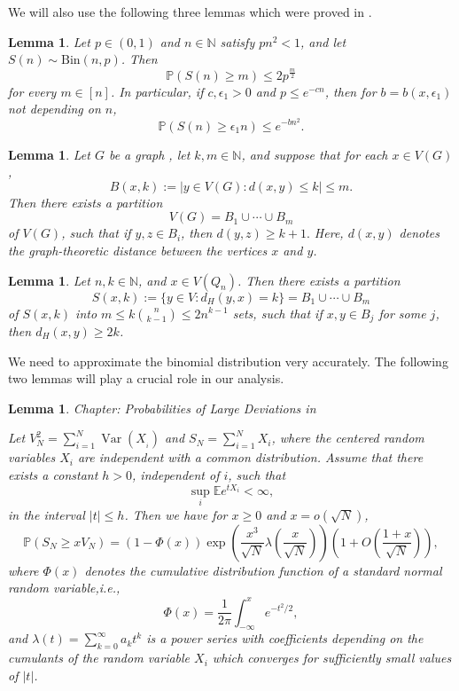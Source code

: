 \documentclass[reqno,11pt]{amsart}
\newtheorem{lemma}[theorem]{Lemma}
\renewcommand{\leq}{\leqslant}
\renewcommand{\geq}{\geqslant}
\DeclareMathOperator{\Var}{Var}
\begin{document}
We will also use the following three lemmas which were proved in \cite{balogh2007majority}. 
\begin{lemma} \label{lemma:S(n) m}
    Let $p \in (0,1)$ and $n \in \mathbb{N}$ satisfy $pn^2 <1$, and let $S(n) \sim \text{Bin}(n,p)$. Then 
    $$\mathbb{P}(S(n) \geq m) \leq 2p^{\frac{m}{2}}$$
for every $m \in [n]$. In particular, if $c,\epsilon_1 >0 $ and $p \leq e^{-cn}$, then for $b=b(x,\epsilon_1)$ not depending on $n$,
$$\mathbb{P}(S(n)\geq \epsilon_1 n) \leq e^{-bn^2}.$$
\end{lemma}

\begin{lemma} \label{lemma: graph partition}
Let $G$ be a graph , let $k,m \in \mathbb{N}$, and suppose that for each $x \in V(G)$,
$$B(x,k):=|y \in V(G):d(x,y) \leq k| \leq m.$$
Then there exists a partition
$$V(G)=B_1 \cup \cdots \cup B_m$$
of $V(G)$, such that if $y,z \in B_i$, then $d(y,z) \geq k+1.$ Here, $d(x,y)$ denotes the graph-theoretic distance between the vertices $x$ and $y$. 
\end{lemma}

\begin{lemma} \label{lemma: graph partition for hypercube}
 Let $n,k \in \mathbb{N}$, and $x \in V(Q_n)$. Then there exists a partition 
 $$S(x,k):=\{y \in V:d_H(y,x)=k\}=B_1 \cup \cdots \cup B_m$$
 of $S(x,k)$ into $m \leq k \binom{n}{k-1} \leq 2n^{k-1}$ sets, such that if $x,y \in B_j$ for some $j$, then $d_H(x,y) \geq 2k$. 
\end{lemma}

We need to approximate the binomial distribution very accurately. The following two lemmas will play a crucial role in our analysis. 

\begin{lemma} Chapter: Probabilities of Large Deviations in \cite{Petrov1975} \label{lemma: Petrov}

 Let $V_{N}^2=\sum_{i=1}^{N} \Var(X_{_i})$ and $S_{N}=\sum_{i=1}^{N} X_{i}$, where the centered random variables $X_{i}$  are independent with a common distribution. Assume that there exists a constant $h>0$, independent of $i$, such that 
$$\sup_{i}\mathbb{E}e^{tX_{i}}<\infty,$$
in the interval $|t| \leq h$. 
Then we have for $x \geq 0$ and $x=o(\sqrt{N})$, 
$$\mathbb{P}(S_{N} \geq x V_{N})=\left(1-\Phi(x) \right)  \exp\left(\frac{x^3}{\sqrt{N}} \lambda \left(\frac{x}{\sqrt{N}} \right) \right) \left(1+O\left(\frac{1+x}{\sqrt{N}} \right) \right),$$
where $\Phi(x)$ denotes the cumulative distribution function of a standard normal random variable,i.e.,
$$\Phi(x)=\frac{1}{2\pi}\int_{-\infty}^{x} e^{-t^2/2},$$
and 
$\lambda(t)=\sum_{k=0}^{\infty} a_kt^k$ is a power series with coefficients depending on the cumulants of the random variable $X_i$ which converges for sufficiently small values of $|t|$. 
\end{lemma}
\end{document}
